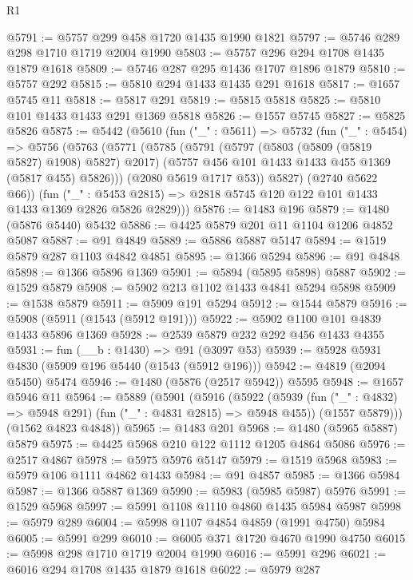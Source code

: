 \begin{lexlean}{R1}
\begin{coremodule}
@5791 := @5757 @299 @458 @1720 @1435 @1990 @1821
@5797 := @5746 @289 @298 @1710 @1719 @2004 @1990
@5803 := @5757 @296 @294 @1708 @1435 @1879 @1618
@5809 := @5746 @287 @295 @1436 @1707 @1896 @1879
@5810 := @5757 @292
@5815 := @5810 @294 @1433 @1435 @291 @1618
@5817 := @1657 @5745 @11
@5818 := @5817 @291
@5819 := @5815 @5818
@5825 := @5810 @101 @1433 @1433 @291 @1369 @5818
@5826 := @1557 @5745
@5827 := @5825 @5826
@5875 := @5442
    (@5610
      (fun ("_" : @5611) =>
      @5732
        (fun ("_" : @5454) =>
        @5756
          (@5763
            (@5771
              (@5785
                (@5791
                  (@5797 (@5803 (@5809 (@5819 @5827) @1908) @5827) @2017)
                  (@5757 @456 @101 @1433 @1433 @455 @1369 (@5817 @455) @5826)))
              (@2080 @5619 @1717 @53))
            @5827)
          (@2740 @5622 @66))
        (fun ("_" : @5453 @2815) =>
        @2818 @5745 @120 @122 @101 @1433 @1433 @1369 @2826 @5826 @2829)))
@5876 := @1483 @196
@5879 := @1480 (@5876 @5440) @5432
@5886 := @4425 @5879 @201 @11 @1104 @1206 @4852 @5087
@5887 := @91 @4849
@5889 := @5886 @5887 @5147
@5894 := @1519 @5879 @287 @1103 @4842 @4851
@5895 := @1366 @5294
@5896 := @91 @4848
@5898 := @1366 @5896 @1369
@5901 := @5894 (@5895 @5898) @5887
@5902 := @1529 @5879
@5908 := @5902 @213 @1102 @1433 @4841 @5294 @5898
@5909 := @1538 @5879
@5911 := @5909 @191 @5294
@5912 := @1544 @5879
@5916 := @5908 (@5911 (@1543 (@5912 @191)))
@5922 := @5902 @1100 @101 @4839 @1433 @5896 @1369
@5928 := @2539 @5879 @232 @292 @456 @1433 @4355
@5931 := fun (__b : @1430) => @91 (@3097 @53)
@5939 := @5928 @5931 @4830 (@5909 @196 @5440 (@1543 (@5912 @196)))
@5942 := @4819 (@2094 @5450) @5474
@5946 := @1480 (@5876 (@2517 @5942)) @5595
@5948 := @1657 @5946 @11
@5964 := @5889
    (@5901
      (@5916
        (@5922
          (@5939 (fun ("_" : @4832) => @5948 @291) (fun ("_" : @4831 @2815) => @5948 @455))
          (@1557 @5879)))
      (@1562 @4823 @4848))
@5965 := @1483 @201
@5968 := @1480 (@5965 @5887) @5879
@5975 := @4425 @5968 @210 @122 @1112 @1205 @4864 @5086
@5976 := @2517 @4867
@5978 := @5975 @5976 @5147
@5979 := @1519 @5968
@5983 := @5979 @106 @1111 @4862 @1433
@5984 := @91 @4857
@5985 := @1366 @5984
@5987 := @1366 @5887 @1369
@5990 := @5983 (@5985 @5987) @5976
@5991 := @1529 @5968
@5997 := @5991 @1108 @1110 @4860 @1435 @5984 @5987
@5998 := @5979 @289
@6004 := @5998 @1107 @4854 @4859 (@1991 @4750) @5984
@6005 := @5991 @299
@6010 := @6005 @371 @1720 @4670 @1990 @4750
@6015 := @5998 @298 @1710 @1719 @2004 @1990
@6016 := @5991 @296
@6021 := @6016 @294 @1708 @1435 @1879 @1618
@6022 := @5979 @287

\end{coremodule}
\end{lexlean}
